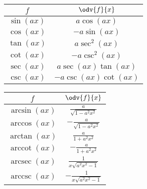 \documentclass{article}
\DeclareMathOperator{\arccot}{arccot}
\DeclareMathOperator{\arcsec}{arcsec}
\DeclareMathOperator{\arccsc}{arccsc}
\begin{document}
\begin{table}[H]
    \renewcommand*{\arraystretch}{1.5}
    \centering
    \begin{tabular}{c c}
        \toprule
        \(f\)                       & \(\odv{f}{x}\)                                       \\
        \midrule
        \(\sin{\left( ax \right)}\) & \(a\cos{\left( ax \right)}\)                         \\
        \(\cos{\left( ax \right)}\) & \(-a\sin{\left( ax \right)}\)                        \\
        \(\tan{\left( ax \right)}\) & \(a\sec^2{\left( ax \right)}\)                       \\
        \(\cot{\left( ax \right)}\) & \(-a\csc^2{\left( ax \right)}\)                      \\
        \(\sec{\left( ax \right)}\) & \(a\sec{\left( ax \right)}\tan{\left( ax \right)}\)  \\
        \(\csc{\left( ax \right)}\) & \(-a\csc{\left( ax \right)}\cot{\left( ax \right)}\) \\[5pt]
        \bottomrule
    \end{tabular}
    \begin{tabular}{c c}
        \toprule
        \(f\)                          & \(\odv{f}{x}\)                                  \\
        \midrule
        \(\arcsin{\left( ax \right)}\) & \(\displaystyle  \frac{a}{\sqrt{1-a^2x^2}}\)    \\[8pt]
        \(\arccos{\left( ax \right)}\) & \(\displaystyle -\frac{a}{\sqrt{1-a^2x^2}}\)    \\[8pt]
        \(\arctan{\left( ax \right)}\) & \(\displaystyle  \frac{a}{1+a^2x^2}\)           \\[8pt]
        \(\arccot{\left( ax \right)}\) & \(\displaystyle -\frac{a}{1+a^2x^2}\)           \\[8pt]
        \(\arcsec{\left( ax \right)}\) & \(\displaystyle  \frac{1}{x\sqrt{a^2x^2 - 1}}\) \\[8pt]
        \(\arccsc{\left( ax \right)}\) & \(\displaystyle -\frac{1}{x\sqrt{a^2x^2 - 1}}\) \\[8pt]
        \bottomrule
    \end{tabular}
\end{table}
\end{document}
